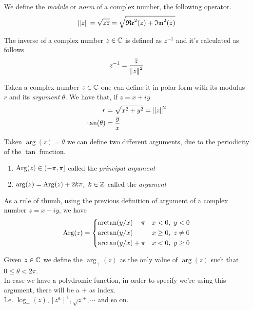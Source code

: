 \documentclass[../complete.tex]{subfiles}
\begin{document}
\begin{dfn}
	We define the \textit{module} or \textit{norm} of a complex number, the following operator.
	\begin{equation}
		\norm{z}=\sqrt{z\overline{z}}=\sqrt{\mathfrak{Re}^2{(z)}+\mathfrak{Im}^2{(z)}}
		\label{eq:normcomplexz}
	\end{equation}
\end{dfn}
\begin{dfn}
	The inverse of a complex number $z\in\mathbb{C}$ is defined as $z^{-1}$ and it's calculated as follows
	\begin{equation}
		z^{-1}=\frac{\overline{z}}{\norm{z}^2}
		\label{eq:inversez}
	\end{equation}
\end{dfn}
\begin{dfn}
	Taken a complex number $z\in\mathbb{C}$ one can define it in polar form with its modulus $r$ and its \textit{argument} $\theta$. We have that, if $z=x+iy$
	\begin{equation}
		\begin{aligned}
			r&=\sqrt{x^2+y^2}=\norm{z}^2\\
			\tan(\theta)&=\frac{y}{x}
		\end{aligned}
		\label{eq:polar}
	\end{equation}
\end{dfn}
\begin{dfn}
	Taken $\arg(z)=\theta$ we can define two different arguments, due to the periodicity of the $\tan$ function.
	\begin{enumerate}
	\item $\operatorname{\mathrm{Arg}}(z)\in(-\pi,\pi]$ called the \textit{principal argument}
	\item $\arg(z)=\operatorname{\mathrm{Arg}}(z)+2k\pi,\ k\in\mathbb{Z}$ called the \textit{argument}
	\end{enumerate}
	As a rule of thumb, using the previous definition of argument of a complex number $z=x+iy$, we have
	\begin{equation}
		\Arg(z)=\begin{dcases}\arctan(y/x)-\pi&x<0,\ y<0\\\arctan(y/x)&x\ge0,\ z\ne0\\\arctan(y/x)+\pi&x<0,\ y\ge0\end{dcases}
		\label{eq:princargcalc}
	\end{equation}
\end{dfn}
\begin{dfn}[$\arg_+$]
	Given $z\in\mathbb{C}$ we define the $\arg_+(z)$ as the only value of $\arg(z)$ such that $0\le\theta<2\pi$.\\
	In case we have a polydromic function, in order to specify we're using this argument, there will be a $+$ as index.\\
	I.e. $\log_+(z),[z^a]^+,\sqrt{z}^+,\cdots$ and so on.
\end{dfn}
\end{document}
